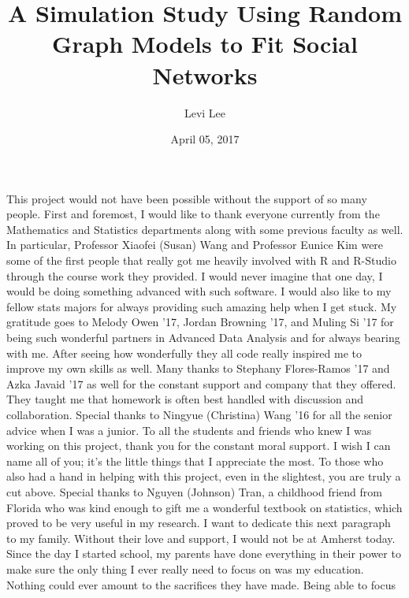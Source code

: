 \documentclass[12pt,twoside]{amherstthesis}
\title{A Simulation Study Using Random Graph Models to Fit Social Networks}
\author{Levi Lee}
\date{April 05, 2017}
\begin{document}
      \maketitle
  
  \frontmatter %
  \pagestyle{empty} %

      \begin{acknowledgements}
      This project would not have been possible without the support of so many
      people. First and foremost, I would like to thank everyone currently
      from the Mathematics and Statistics departments along with some previous
      faculty as well. In particular, Professor Xiaofei (Susan) Wang and
      Professor Eunice Kim were some of the first people that really got me
      heavily involved with R and R-Studio through the course work they
      provided. I would never imagine that one day, I would be doing something
      advanced with such software. I would also like to my fellow stats majors
      for always providing such amazing help when I get stuck. My gratitude
      goes to Melody Owen '17, Jordan Browning '17, and Muling Si '17 for
      being such wonderful partners in Advanced Data Analysis and for always
      bearing with me. After seeing how wonderfully they all code really
      inspired me to improve my own skills as well. Many thanks to Stephany
      Flores-Ramos '17 and Azka Javaid '17 as well for the constant support
      and company that they offered. They taught me that homework is often
      best handled with discussion and collaboration. Special thanks to
      Ningyue (Christina) Wang '16 for all the senior advice when I was a
      junior. To all the students and friends who knew I was working on this
      project, thank you for the constant moral support. I wish I can name all
      of you; it's the little things that I appreciate the most. To those who
      also had a hand in helping with this project, even in the slightest, you
      are truly a cut above. Special thanks to Nguyen (Johnson) Tran, a
      childhood friend from Florida who was kind enough to gift me a wonderful
      textbook on statistics, which proved to be very useful in my research. I
      want to dedicate this next paragraph to my family. Without their love
      and support, I would not be at Amherst today. Since the day I started
      school, my parents have done everything in their power to make sure the
      only thing I ever really need to focus on was my education. Nothing
      could ever amount to the sacrifices they have made. Being able to focus

\end{acknowledgements}
\end{document}
